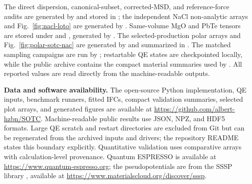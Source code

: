 \documentclass[aps,prb,reprint,amsmath,amssymb,floatfix]{revtex4-2}
\begin{document}
The direct dispersion, canonical-subset, corrected-MSD, and reference-force
audits are generated by 
and stored in ;
the independent NaCl non-analytic arrays and Fig.~\ref{fig:nacl-loto} are
generated by .
Same-volume MgO and PbTe tensors are stored under
 and
, generated by
.
The selected-production polar arrays and Fig.~\ref{fig:polar-sotc-nac} are
generated by  and summarized in
.
The matched sampling campaigns are run by
; restartable QE states
are checkpointed locally, while the public archive contains the compact
material summaries used by
.
All reported values are read directly from the machine-readable outputs.

\textbf{Data and software availability.} The open-source Python implementation,
QE inputs, benchmark runners, fitted IFCs, compact validation summaries,
selected plot arrays, and generated figures are available at
\url{https://github.com/albert-hzbn/SOTC}. Machine-readable public results use
JSON, NPZ, and HDF5 formats. Large QE scratch and restart directories are
excluded from Git but can be regenerated from the archived inputs and drivers;
the repository README states this boundary explicitly. Quantitative validation
uses comparative arrays with calculation-level provenance. Quantum ESPRESSO
\cite{ref46} is available at
\url{https://www.quantum-espresso.org}; the pseudopotentials are from the SSSP
library \cite{ref47}, available at
\url{https://www.materialscloud.org/discover/sssp}.


\end{document}
